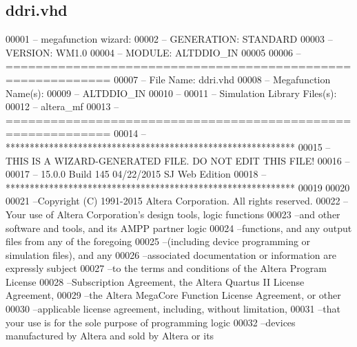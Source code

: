 \subsection{ddri.\+vhd}
\label{ddri_8vhd_source}

\begin{DoxyCode}
00001 \textcolor{keyword}{-- megafunction wizard: %
00002 \textcolor{keyword}{-- GENERATION: STANDARD}
00003 \textcolor{keyword}{-- VERSION: WM1.0}
00004 \textcolor{keyword}{-- MODULE: ALTDDIO\_IN }
00005 
00006 \textcolor{keyword}{-- ============================================================}
00007 \textcolor{keyword}{-- File Name: ddri.vhd}
00008 \textcolor{keyword}{-- Megafunction Name(s):}
00009 \textcolor{keyword}{--          ALTDDIO\_IN}
00010 \textcolor{keyword}{--}
00011 \textcolor{keyword}{-- Simulation Library Files(s):}
00012 \textcolor{keyword}{--          altera\_mf}
00013 \textcolor{keyword}{-- ============================================================}
00014 \textcolor{keyword}{-- ************************************************************}
00015 \textcolor{keyword}{-- THIS IS A WIZARD-GENERATED FILE. DO NOT EDIT THIS FILE!}
00016 \textcolor{keyword}{--}
00017 \textcolor{keyword}{-- 15.0.0 Build 145 04/22/2015 SJ Web Edition}
00018 \textcolor{keyword}{-- ************************************************************}
00019 
00020 
00021 \textcolor{keyword}{--Copyright (C) 1991-2015 Altera Corporation. All rights reserved.}
00022 \textcolor{keyword}{--Your use of Altera Corporation's design tools, logic functions }
00023 \textcolor{keyword}{--and other software and tools, and its AMPP partner logic }
00024 \textcolor{keyword}{--functions, and any output files from any of the foregoing }
00025 \textcolor{keyword}{--(including device programming or simulation files), and any }
00026 \textcolor{keyword}{--associated documentation or information are expressly subject }
00027 \textcolor{keyword}{--to the terms and conditions of the Altera Program License }
00028 \textcolor{keyword}{--Subscription Agreement, the Altera Quartus II License Agreement,}
00029 \textcolor{keyword}{--the Altera MegaCore Function License Agreement, or other }
00030 \textcolor{keyword}{--applicable license agreement, including, without limitation, }
00031 \textcolor{keyword}{--that your use is for the sole purpose of programming logic }
00032 \textcolor{keyword}{--devices manufactured by Altera and sold by Altera or its }
}
\end{DoxyCode}
